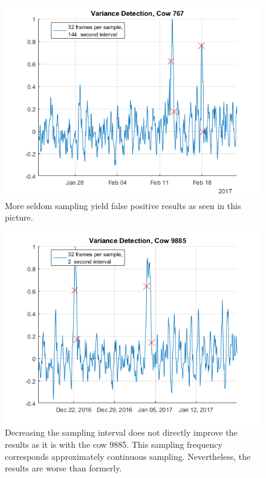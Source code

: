 \begin{figure}[htb]
\centering
\includegraphics[width = 0.75 \textwidth]{figures/VarianceDetectionCow767_32frames144seconds.png}
\caption{More seldom sampling yield false positive results as seen in this picture.}
\label{VarianceDetectionCow767_32frames144seconds}
\end{figure}


\begin{figure}[htb]
\centering
\includegraphics[width = 0.75 \textwidth]{figures/VarianceDetectionCow9885_32frames2seconds.png}
\caption{Decreasing the sampling interval does not directly improve the results as it is with the cow 9885. This sampling frequency corresponds approximately continuous sampling. Nevertheless, the results are worse than formerly.}
\label{VarianceDetectionCow9885_32frames2seconds}
\end{figure}



